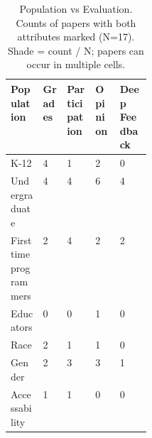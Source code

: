 \begin{table}[!htbp]
\centering
\small
\setlength{\tabcolsep}{4pt}
\renewcommand{\arraystretch}{1.3}
\caption{Population vs Evaluation. Counts of papers with both attributes marked (N=17). Shade = count / N; papers can occur in multiple cells.}
\begin{tabularx}{\linewidth}{|>{\raggedright\arraybackslash}p{0.23\linewidth}|>{\centering\arraybackslash}X|>{\centering\arraybackslash}X|>{\centering\arraybackslash}X|>{\centering\arraybackslash}X|}
\hline
\textbf{Population} & \textbf{\hspace{0pt}Grades} & \textbf{\hspace{0pt}Participation} & \textbf{\hspace{0pt}Opinion} & \textbf{\hspace{0pt}Deep Feedback} \\ \hline
K-12 & \cellcolor{purple!24}4 & \cellcolor{purple!6}1 & \cellcolor{purple!12}2 & \cellcolor{purple!0}0 \\ \hline
Undergraduate & \cellcolor{purple!24}4 & \cellcolor{purple!24}4 & \cellcolor{purple!35}6 & \cellcolor{purple!24}4 \\ \hline
First time programmers & \cellcolor{purple!12}2 & \cellcolor{purple!24}4 & \cellcolor{purple!12}2 & \cellcolor{purple!12}2 \\ \hline
Educators & \cellcolor{purple!0}0 & \cellcolor{purple!0}0 & \cellcolor{purple!6}1 & \cellcolor{purple!0}0 \\ \hline
Race & \cellcolor{purple!12}2 & \cellcolor{purple!6}1 & \cellcolor{purple!6}1 & \cellcolor{purple!0}0 \\ \hline
Gender & \cellcolor{purple!12}2 & \cellcolor{purple!18}3 & \cellcolor{purple!18}3 & \cellcolor{purple!6}1 \\ \hline
Accessability & \cellcolor{purple!6}1 & \cellcolor{purple!6}1 & \cellcolor{purple!0}0 & \cellcolor{purple!0}0 \\ \hline
\end{tabularx}
\end{table}

